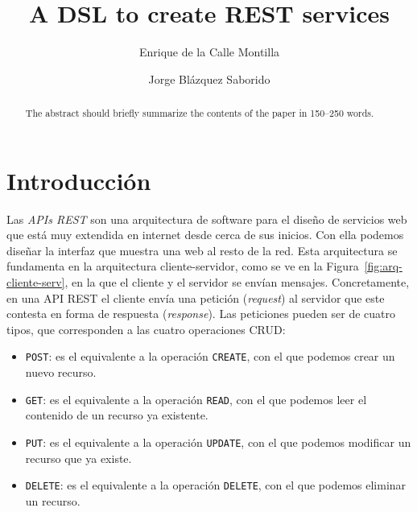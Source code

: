 \documentclass[runningheads]{llncs}
\begin{document}
\title{A DSL to create REST services}

\author{Enrique de la Calle Montilla\and
Jorge Blázquez Saborido}

\maketitle

\begin{abstract}
The abstract should briefly summarize the contents of the paper in
150--250 words.

\end{abstract}

\section{Introducción}


Las \emph{APIs REST} son una arquitectura de software para el diseño
de servicios web que está muy extendida en internet desde cerca de
sus inicios. Con ella podemos diseñar la interfaz que muestra una web
al resto de la red. Esta arquitectura se fundamenta en la arquitectura
cliente-servidor, como se ve en la Figura~\ref{fig:arq-cliente-serv},
en la que el cliente y el servidor se envían mensajes. Concretamente,
en una API REST el cliente envía una petición (\emph{request}) al
servidor que este contesta en forma de respuesta (\emph{response}). Las
peticiones pueden ser de cuatro tipos, que corresponden a las
cuatro operaciones CRUD:

\newcommand\POST{\texttt{POST}}
\newcommand\GET{\texttt{GET}}
\newcommand\PUT{\texttt{PUT}}
\newcommand\DELETE{\texttt{DELETE}}

\newcommand\CREATE{\texttt{CREATE}}
\newcommand\READ{\texttt{READ}}
\newcommand\UPDATE{\texttt{UPDATE}}

\begin{itemize}
    \item \POST: es el equivalente a la operación \CREATE, con el que podemos
        crear un nuevo recurso.
    \item \GET: es el equivalente a la operación \READ, con el que podemos
        leer el contenido de un recurso ya existente.
    \item \PUT: es el equivalente a la operación \UPDATE, con el que podemos
        modificar un recurso que ya existe.
    \item \DELETE: es el equivalente a la operación \DELETE, con el que podemos
        eliminar un recurso.
\end{itemize}
\end{document}
